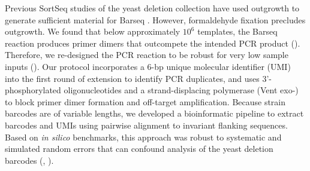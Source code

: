 

Previous SortSeq studies of
the yeast deletion collection have used outgrowth 
to generate sufficient material for 
Barseq \parencite{sliva2016barcode}. However, formaldehyde fixation precludes
outgrowth. We found that below approximately $10^6$ templates, the
Barseq reaction produces primer dimers
that outcompete the intended PCR product (). 
Therefore, we re-designed the
PCR reaction \parencite{robinson2014design,smith2009quantitative} to be robust for
very low sample inputs (). Our protocol
incorporates a 6-bp unique molecular identifier (UMI) into the first
round of extension to identify PCR duplicates, 
and uses 3'-phosphorylated oligonucleotides and a
strand-displacing polymerase (Vent exo-) to block primer dimer formation and 
off-target amplification. 
Because strain barcodes are of variable lengths, 
we developed a bioinformatic pipeline to extract barcodes and UMIs 
using pairwise alignment to invariant flanking sequences.
Based on \textit{in silico} benchmarks, this
approach was robust to systematic and simulated random errors 
that can confound analysis of the yeast deletion barcodes 
(, ). 

